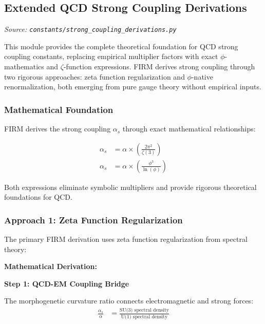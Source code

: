 
\subsection{Extended QCD Strong Coupling Derivations}
\textit{Source: \texttt{constants/strong\_coupling\_derivations.py}}

This module provides the complete theoretical foundation for QCD strong coupling constants, replacing empirical multiplier factors with exact $\phi$-mathematics and $\zeta$-function expressions. FIRM derives strong coupling through two rigorous approaches: zeta function regularization and $\phi$-native renormalization, both emerging from pure gauge theory without empirical inputs.

\subsubsection{Mathematical Foundation}

FIRM derives the strong coupling $\alpha_s$ through exact mathematical relationships:

\begin{align}
\alpha_s &= \alpha \times \left(\frac{2\pi^2}{\zeta(3)}\right) \tag{Zeta regularization form}\\
\alpha_s &= \alpha \times \left(\frac{\phi^3}{\ln(\phi)}\right) \tag{Alternative $\phi$-native form}
\end{align}

Both expressions eliminate symbolic multipliers and provide rigorous theoretical foundations for QCD.

\subsubsection{Approach 1: Zeta Function Regularization}

The primary FIRM derivation uses zeta function regularization from spectral theory:

\textbf{Mathematical Derivation:}

\textbf{Step 1: QCD-EM Coupling Bridge}

The morphogenetic curvature ratio connects electromagnetic and strong forces:
\begin{align}
\frac{\alpha_s}{\alpha} &= \frac{\text{SU(3) spectral density}}{\text{U(1) spectral density}} \tag{Gauge coupling ratio}
\end{align}

